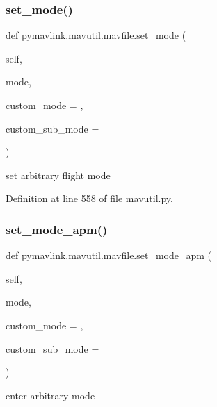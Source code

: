 \mbox{\label{classpymavlink_1_1mavutil_1_1mavfile_a284eb9b6577bb9d50a67f11ce892769f}} 
\subsubsection{\texorpdfstring{set\_mode()}{set\_mode()}}
{\footnotesize\ttfamily def pymavlink.\+mavutil.\+mavfile.\+set\+\_\+mode (\begin{DoxyParamCaption}\item[{}]{self,  }\item[{}]{mode,  }\item[{}]{custom\+\_\+mode = {},  }\item[{}]{custom\+\_\+sub\+\_\+mode = {} }\end{DoxyParamCaption})}

\begin{DoxyVerb}set arbitrary flight mode\end{DoxyVerb}
 

Definition at line 558 of file mavutil.\+py.

\mbox{\label{classpymavlink_1_1mavutil_1_1mavfile_a05d005f98f3cbc966f8f00ef013475d5}} 
\subsubsection{\texorpdfstring{set\_mode\_apm()}{set\_mode\_apm()}}
{\footnotesize\ttfamily def pymavlink.\+mavutil.\+mavfile.\+set\+\_\+mode\+\_\+apm (\begin{DoxyParamCaption}\item[{}]{self,  }\item[{}]{mode,  }\item[{}]{custom\+\_\+mode = {},  }\item[{}]{custom\+\_\+sub\+\_\+mode = {} }\end{DoxyParamCaption})}

\begin{DoxyVerb}enter arbitrary mode\end{DoxyVerb}
 

